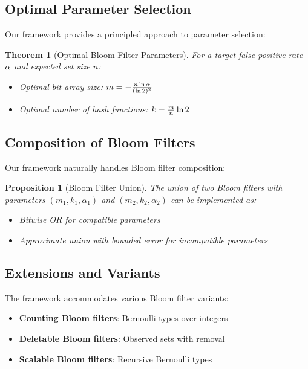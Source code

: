 \documentclass[11pt]{article}
\newtheorem{theorem}{Theorem}
\newtheorem{proposition}{Proposition}
\begin{document}
\subsection{Optimal Parameter Selection}

Our framework provides a principled approach to parameter selection:

\begin{theorem}[Optimal Bloom Filter Parameters]
For a target false positive rate $\alpha$ and expected set size $n$:
\begin{itemize}
\item Optimal bit array size: $m = -\frac{n \ln \alpha}{(\ln 2)^2}$
\item Optimal number of hash functions: $k = \frac{m}{n} \ln 2$
\end{itemize}
\end{theorem}

\subsection{Composition of Bloom Filters}

Our framework naturally handles Bloom filter composition:

\begin{proposition}[Bloom Filter Union]
The union of two Bloom filters with parameters $(m_1, k_1, \alpha_1)$ and $(m_2, k_2, \alpha_2)$ can be implemented as:
\begin{itemize}
\item Bitwise OR for compatible parameters
\item Approximate union with bounded error for incompatible parameters
\end{itemize}
\end{proposition}

\subsection{Extensions and Variants}

The framework accommodates various Bloom filter variants:

\begin{itemize}
\item \textbf{Counting Bloom filters}: Bernoulli types over integers
\item \textbf{Deletable Bloom filters}: Observed sets with removal
\item \textbf{Scalable Bloom filters}: Recursive Bernoulli types
\end{itemize}
\end{document}
